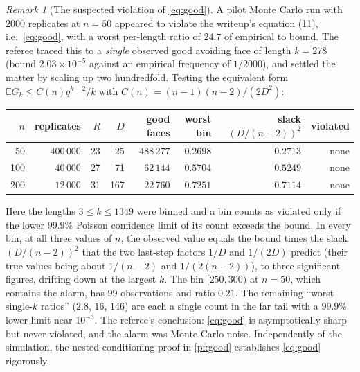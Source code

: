 \documentclass[11pt,a4paper]{article}
\theoremstyle{plain}
\theoremstyle{definition}
\theoremstyle{remark}
\newtheorem{remark}[theorem]{Remark}
\newcommand{\E}{\mathbb E}
\begin{document}
\begin{remark}[The suspected violation of \eqref{eq:good}]\label{rem:eq11}
A pilot Monte Carlo run with $2000$ replicates at $n=50$ appeared to violate the writeup's equation (11), i.e.\ \eqref{eq:good}, with a worst per-length ratio of $24.7$ of empirical to bound. The referee traced this to a \emph{single} observed good avoiding face of length $k=278$ (bound $2.03\times10^{-5}$ against an empirical frequency of $1/2000$), and settled the matter by scaling up two hundredfold. Testing the equivalent form $\E G_k\le C(n)q^{k-2}/k$ with $C(n)=(n-1)(n-2)/(2D^2)$:
\begin{center}\small
\begin{tabular}{@{}rrrrrrrr@{}}\toprule
$n$ & replicates & $R$ & $D$ & good faces & worst bin & slack $(D/(n-2))^2$ & violated\\\midrule
50 & $400\,000$ & 23 & 25 & $488\,277$ & $0.2698$ & $0.2713$ & none\\
100 & $40\,000$ & 27 & 71 & $62\,144$ & $0.5704$ & $0.5249$ & none\\
200 & $12\,000$ & 31 & 167 & $22\,760$ & $0.7251$ & $0.7114$ & none\\\bottomrule
\end{tabular}
\end{center}
Here the lengths $3\le k\le1349$ were binned and a bin counts as violated only if the lower $99.9\%$ Poisson confidence limit of its count exceeds the bound. In every bin, at all three values of $n$, the observed value equals the bound times the slack $(D/(n-2))^2$ that the two last-step factors $1/D$ and $1/(2D)$ predict (their true values being about $1/(n-2)$ and $1/(2(n-2))$), to three significant figures, drifting down at the largest $k$. The bin $[250,300)$ at $n=50$, which contains the alarm, has $99$ observations and ratio $0.21$. The remaining ``worst single-$k$ ratios'' ($2.8$, $16$, $146$) are each a single count in the far tail with a $99.9\%$ lower limit near $10^{-3}$. The referee's conclusion: \eqref{eq:good} is asymptotically sharp but never violated, and the alarm was Monte Carlo noise. Independently of the simulation, the nested-conditioning proof in \cref{pf:good} establishes \eqref{eq:good} rigorously.
\end{remark}
\end{document}
